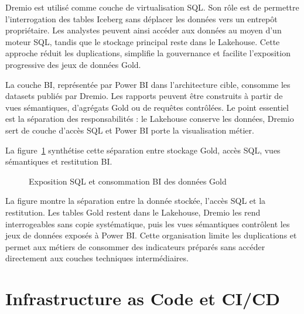 Dremio est utilisé comme couche de virtualisation SQL. Son rôle est de permettre l'interrogation des tables Iceberg sans déplacer les données vers un entrepôt propriétaire. Les analystes peuvent ainsi accéder aux données au moyen d'un moteur SQL, tandis que le stockage principal reste dans le Lakehouse. Cette approche réduit les duplications, simplifie la gouvernance et facilite l'exposition progressive des jeux de données Gold.

La couche BI, représentée par Power BI dans l'architecture cible, consomme les datasets publiés par Dremio. Les rapports peuvent être construits à partir de vues sémantiques, d'agrégats Gold ou de requêtes contrôlées. Le point essentiel est la séparation des responsabilités : le Lakehouse conserve les données, Dremio sert de couche d'accès SQL et Power BI porte la visualisation métier.

La figure~\ref{fig:virtualisation-bi} synthétise cette séparation entre stockage Gold, accès SQL, vues sémantiques et restitution BI.

\begin{figure}[H]
\centering
{}
\caption{Exposition SQL et consommation BI des données Gold}
\label{fig:virtualisation-bi}
\end{figure}

La figure montre la séparation entre la donnée stockée, l'accès SQL et la restitution. Les tables Gold restent dans le Lakehouse, Dremio les rend interrogeables sans copie systématique, puis les vues sémantiques contrôlent les jeux de données exposés à Power BI. Cette organisation limite les duplications et permet aux métiers de consommer des indicateurs préparés sans accéder directement aux couches techniques intermédiaires.

\section{Infrastructure as Code et CI/CD}

